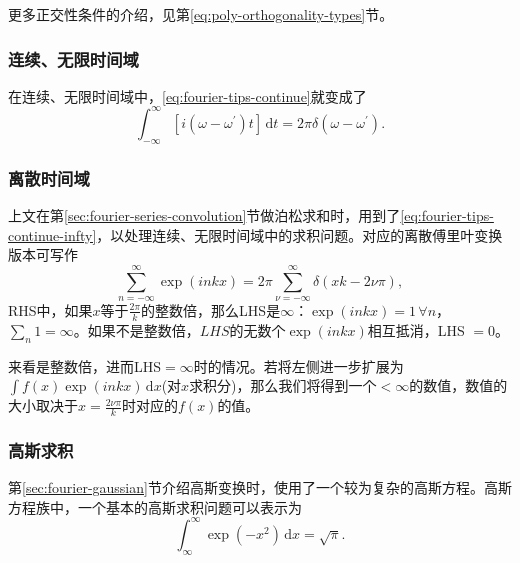 更多正交性条件的介绍，见第\ref{eq:poly-orthogonality-types}节。

\subsubsection{连续、无限时间域}
\label{eq:fourier-tips-cont-infty}

在连续、无限时间域中，\eqref{eq:fourier-tips-continue}就变成了
\begin{equation}
\label{eq:fourier-tips-continue-infty}
\int_{-\infty}^{\infty}
\left[
i \left( \omega - \omega^{'}  \right) t
\right] \, \mathrm{d} t = 2 \pi \delta \left( \omega - \omega^{'} \right).
\end{equation}

\subsubsection{离散时间域}
\label{eq:fourier-tips-discrete-infty}

上文在第\ref{sec:fourier-series-convolution}节做泊松求和时，用到了\eqref{eq:fourier-tips-continue-infty}，以处理连续、无限时间域中的求积问题。对应的离散傅里叶变换版本可写作
\begin{equation*}
\sum_{n = - \infty}^{\infty} \exp \left( i n k x \right) = 2 \pi \sum_{\nu = - \infty}^{\infty} \delta \left( x k - 2 \nu \pi \right),
\end{equation*}
RHS中，如果$x$等于$\frac{2\pi}{k}$的整数倍，那么LHS是$\infty$：$\exp \left( i n k x \right) = 1 \, \forall n$，$\sum_{n} 1 = \infty$。如果不是整数倍，$LHS$的无数个$\exp \left( i n k x \right)$相互抵消，LHS $= 0$。

来看是整数倍，进而LHS$=\infty$时的情况。若将左侧进一步扩展为$\int f(x) \exp \left( i n k x \right) \, \mathrm{d} x$(对$x$求积分)，那么我们将得到一个$ < \infty$的数值，数值的大小取决于$x = \frac{2 \nu \pi}{k}$时对应的$f(x)$的值。

\subsubsection{高斯求积}
\label{sec:fourier-tips-gaussian}
第\ref{sec:fourier-gaussian}节介绍高斯变换时，使用了一个较为复杂的高斯方程。高斯方程族中，一个基本的高斯求积问题可以表示为
\begin{equation}
\label{eq:fourier-tips-gaussian-basic}
\int_{\infty}^{\infty} \exp \left( - x^{2} \right) \, \mathrm{d} x
= \sqrt{\pi}.
\end{equation}

